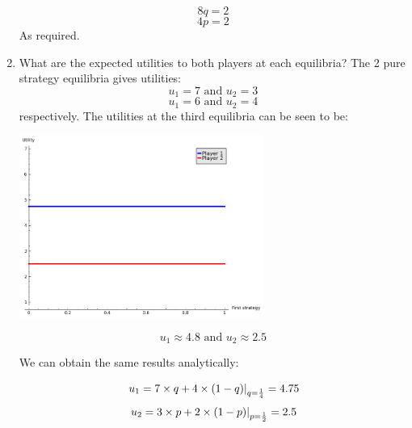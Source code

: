 \documentclass[12pt]{article}
\begin{document}
\begin{enumerate}
$$8q=2$$
$$4p=2$$
As required.
\item What are the expected utilities to both players at each equilibria?
The 2 pure strategy equilibria gives utilities:
$$u_1=7\text{ and }u_2=3$$
$$u_1=6\text{ and }u_2=4$$
respectively. The utilities at the third equilibria can be seen to be:

\begin{center}
\includegraphics[width=8cm]{sage13.png}
\end{center}

$$u_1\approx4.8\text{ and }u_2\approx2.5$$

We can obtain the same results analytically:

$$\left.u_1=7\times q+4\times(1-q)\right|_{q={1\over4}}=4.75$$
$$\left.u_2=3\times p+2\times(1-p)\right|_{p={1\over2}}=2.5$$

\end{enumerate}
\end{document}
